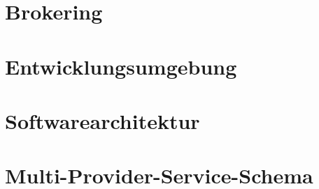 \section{Brokering}



%
%
%
%
%
%
%


%
%
%
%
%










\section{Entwicklungsumgebung}


\section{Softwarearchitektur}

%


\section{Multi-Provider-Service-Schema}


